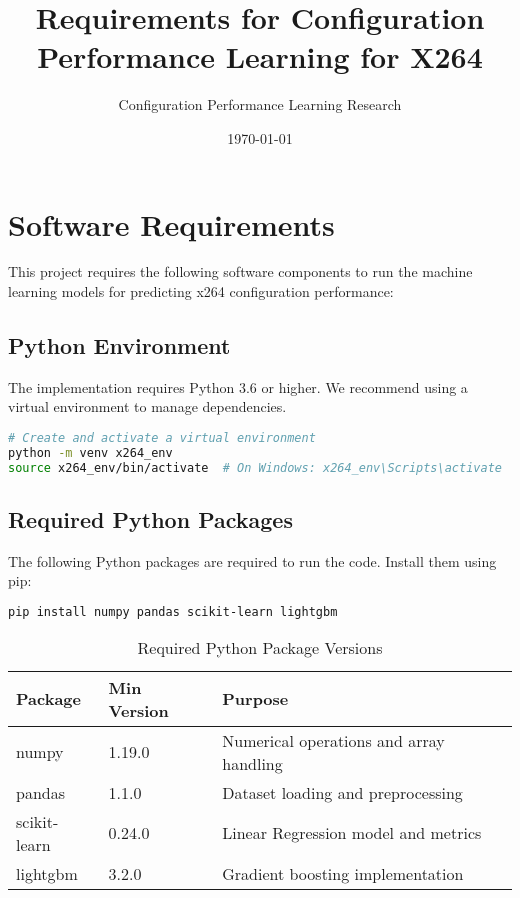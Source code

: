 \documentclass[10pt]{article}
\title{Requirements for Configuration Performance Learning for X264}
\author{Configuration Performance Learning Research}
\date{\today}
\begin{document}
\maketitle

\section{Software Requirements}

This project requires the following software components to run the machine learning models for predicting x264 configuration performance:

\subsection{Python Environment}
The implementation requires Python 3.6 or higher. We recommend using a virtual environment to manage dependencies.

\begin{lstlisting}[language=bash]
# Create and activate a virtual environment
python -m venv x264_env
source x264_env/bin/activate  # On Windows: x264_env\Scripts\activate
\end{lstlisting}

\subsection{Required Python Packages}
The following Python packages are required to run the code. Install them using pip:

\begin{lstlisting}[language=bash]
pip install numpy pandas scikit-learn lightgbm
\end{lstlisting}

\begin{table}[h]
\centering
\caption{Required Python Package Versions}
\begin{tabular}{lll}
\toprule
\textbf{Package} & \textbf{Min Version} & \textbf{Purpose} \\
\midrule
numpy & 1.19.0 & Numerical operations and array handling \\
pandas & 1.1.0 & Dataset loading and preprocessing \\
scikit-learn & 0.24.0 & Linear Regression model and metrics \\
lightgbm & 3.2.0 & Gradient boosting implementation \\
\bottomrule
\end{tabular}
\end{table}
\end{document}
